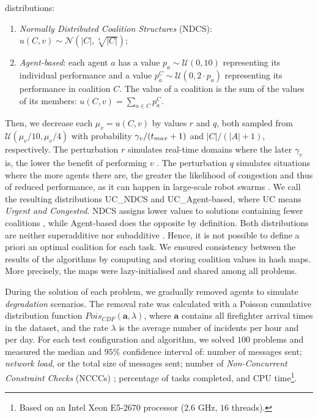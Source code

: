 distributions:
\begin{enumerate}
    \item \emph{Normally Distributed Coalition Structures} (NDCS): $u(C, v) \sim
        \mathcal{N}(|C|, \sqrt[4]{|C|})$;
    \item \emph{Agent-based}: each agent $a$ has a value $p_a \sim \mathcal{U}(0,
        10)$ representing its individual performance and a value $p_a^C \sim
        \mathcal{U}(0, 2 \cdot p_a)$ representing its performance in coalition
        $C$. The value of a coalition is the sum of the values of its members:
        $u(C, v) = \sum_{a \in C} p_a^C$.
\end{enumerate}
Then, we decrease each $\mu_v = u(C, v)$ by values $r$ and $q$, both sampled from
$\mathcal{U}(\mu_v / 10, \mu_v / 4)$ with probability $\gamma_v/(t_{max} + 1)$ and $|C|/(|A|
+ 1)$, respectively. The perturbation $r$ simulates real-time domains where the later
$\gamma_v$ is, the lower the benefit of performing $v$ \cite{stankovic2013edf}. The
perturbation $q$ simulates situations where the more agents there are, the greater the
likelihood of congestion and thus of reduced performance, as it can happen in large-scale
robot swarms \cite{guerrero2017}. We call the resulting distributions UC\_NDCS and
UC\_Agent-based, where UC means \emph{Urgent and Congested}. NDCS assigns lower values to
solutions containing fewer coalitions \cite{rahwan2009}, while Agent-based does the
opposite by definition. Both distributions are neither superadditive nor subadditive
\cite{rahwan2015survey}. Hence, it is not possible to define a priori an optimal coalition
for each task.
We ensured consistency between the results of the algorithms by computing and storing
coalition values in hash maps. More precisely, the maps were lazy-initialised and shared
among all problems.

During the solution of each problem, we gradually removed agents to simulate
\emph{degradation} scenarios. The removal rate was calculated with a Poisson cumulative
distribution function $Pois_{CDF}(\bm{a}, \lambda)$, where $\bm{a}$ contains all
firefighter arrival times in the dataset, and the rate $\lambda$ is the average number of
incidents per hour and per day. For each test configuration and algorithm, we solved
$100$ problems and measured the median and $95\%$ confidence interval of: number of
messages sent; \emph{network load}, or the total size of messages sent; number of
\emph{Non-Concurrent Constraint Checks} (NCCCs) \cite{meisels2007}; percentage of tasks
completed, and CPU time\footnote{Based on an Intel Xeon E5-2670 processor ($2.6$ GHz, $16$
threads).}.

